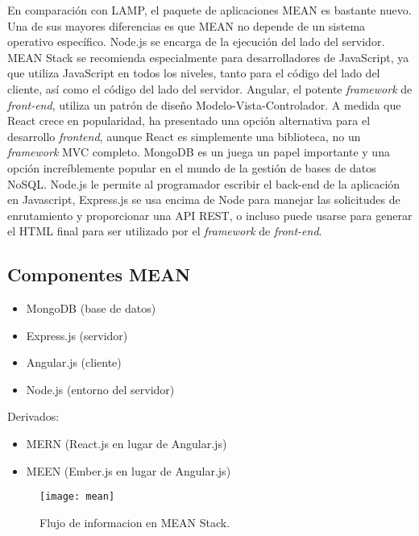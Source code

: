 En comparación con LAMP, el paquete de aplicaciones MEAN es bastante nuevo. Una de sus mayores diferencias es que MEAN no depende de un sistema operativo específico. Node.js se encarga de la ejecución del lado del servidor. MEAN Stack se recomienda especialmente para desarrolladores de JavaScript, ya que utiliza JavaScript en todos los niveles, tanto para el código del lado del cliente, así como el código del lado del servidor. Angular, el potente \textit{framework} de \textit{front-end}, utiliza un patrón de diseño Modelo-Vista-Controlador. A medida que React crece en popularidad, ha presentado una opción alternativa para el desarrollo \textit{frontend}, aunque React es simplemente una biblioteca, no un \textit{framework} MVC completo. MongoDB es un juega un papel importante y una opción increíblemente popular en el mundo de la gestión de bases de datos NoSQL. Node.js le permite al programador escribir el back-end de la aplicación en Javascript, Express.js se usa encima de Node para manejar las solicitudes de enrutamiento y proporcionar una API REST, o incluso puede usarse para generar el HTML final para ser utilizado por el \textit{framework} de \textit{front-end}.
\subsection{Componentes MEAN}
\begin{itemize}
  \item MongoDB (base de datos)
  \item Express.js (servidor)
  \item Angular.js (cliente)
  \item Node.js (entorno del servidor)
\end{itemize}

Derivados:

\begin{itemize}
  \item MERN (React.js en lugar de Angular.js)
  \item MEEN (Ember.js en lugar de Angular.js)
\end{itemize}

\begin{figure}[H]
  \centering
  \texttt{[image: mean]}
  \caption{Flujo de informacion en MEAN Stack.}
\end{figure}

